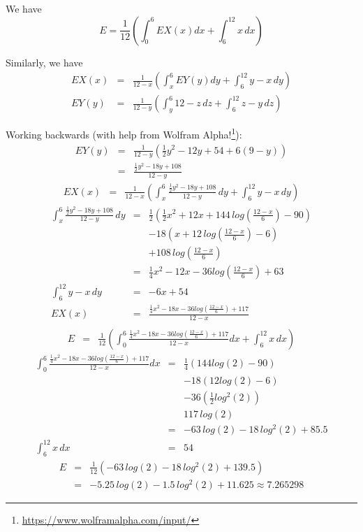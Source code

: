 \documentclass{article}
\begin{document}
We have
$$ E =  \frac{1}{12} \left({\int_{0}^{6} EX(x) dx} + {\int_{6}^{12} x \,dx}\right)$$

Similarly, we have
\begin{eqnarray*}
EX(x) &=& \frac{1}{12-x} \left({\int_{x}^{6} EY(y) dy} + {\int_{6}^{12} y-x \,dy}\right)\\
EY(y) &=&  \frac{1}{12-y} \left({\int_{y}^{6} 12-z \,dz} + {\int_{6}^{12} z-y \,dz}\right)
\end{eqnarray*} 

Working backwards (with help from Wolfram Alpha!\footnote{\url{https://www.wolframalpha.com/input/}}):
\begin{eqnarray*}
EY(y) &=& \frac{1}{12-y} \left( \frac{1}{2} y^2 -12 y + 54 + 6(9-y) \right)\\
&=& \frac{\frac{1}{2}y^2 -18y +108}{12-y}
\end{eqnarray*}
\begin{eqnarray*}
EX(x) &=& \frac{1}{12-x} \left({\int_{x}^{6} \frac{\frac{1}{2}y^2 -18y +108}{12-y} \,dy} + {\int_{6}^{12} y-x \,dy}\right)
\end{eqnarray*}
\begin{eqnarray*}
\int_{x}^{6} \frac{\frac{1}{2}y^2 -18y +108}{12-y} \,dy &=& \frac{1}{2} \left(\frac{1}{2}x^2 + 12x + 144\,log\left(\frac{12-x}{6}\right)-90\right)\\
&&-18\left(x + 12\,log\left(\frac{12-x}{6}\right) -6\right)\\
&&+108 \, log\left(\frac{12-x}{6}\right)\\
&=&\frac{1}{4}x^2 -12x -36log\left(\frac{12-x}{6}\right) + 63\\
{\int_{6}^{12} y-x \,dy}&=&-6x +54\\
EX(x)&=&\frac{\frac{1}{4}x^2 -18x -36log\left(\frac{12-x}{6}\right) + 117}{12-x}\\
\end{eqnarray*}
\begin{eqnarray*}
E &=&  \frac{1}{12} \left({\int_{0}^{6} \frac{\frac{1}{4}x^2 -18x -36log\left(\frac{12-x}{6}\right) + 117}{12-x} dx} + {\int_{6}^{12} x \,dx}\right)
\end{eqnarray*}
\begin{eqnarray*}
\int_{0}^{6} \frac{\frac{1}{4}x^2 -18x -36log\left(\frac{12-x}{6}\right) + 117}{12-x} dx &=&\frac{1}{4}\left(144log(2) - 90\right)\\
&&-18\left(12log(2) - 6\right)\\
&&-36\left(\frac{1}{2}log^2(2)\right)\\
&&117\,log(2)\\
&=&-63\, log(2) - 18 \,log^2(2) +85.5\\
\int_{6}^{12} x \,dx &=& 54                                                            
\end{eqnarray*}
\begin{eqnarray*}
E &=& \frac{1}{12}\left(-63\, log(2) - 18 \,log^2(2) +139.5\right)\\
&=& -5.25\,log(2) - 1.5\,log^2(2)+11.625 \approx 7.265298
\end{eqnarray*}
\end{document}

